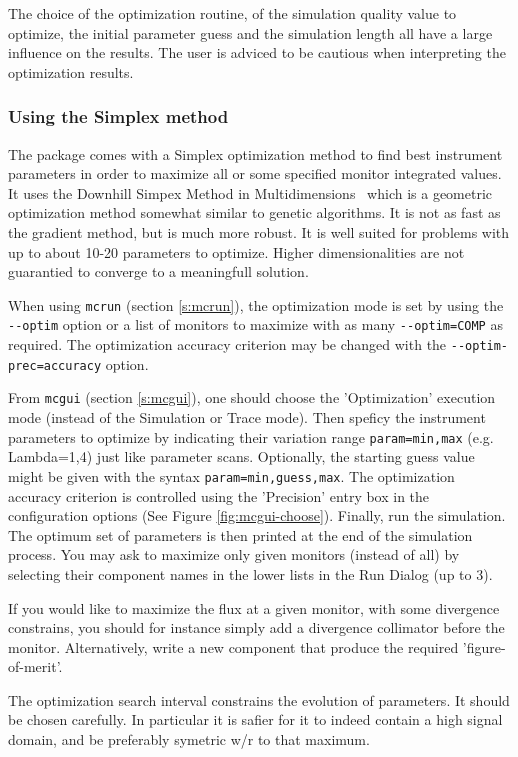 The choice of the optimization routine, of the simulation quality
value to optimize, the initial parameter guess and the simulation
length all have a large influence on the results.
The user is adviced to be cautious when interpreting the optimization results.

\subsubsection{Using the Simplex method}

The \MCS package comes with a Simplex optimization method to find best instrument parameters in order to maximize all or some specified monitor integrated values. It uses the Downhill Simpex Method in Multidimensions~\cite{neldermead,NumRecip} which is a geometric optimization method somewhat similar to genetic algorithms. It is not as fast as the gradient method, but is much more robust. It is well suited for problems with up to about 10-20 parameters to optimize. Higher dimensionalities are not guarantied to converge to a meaningfull solution.

When using \verb+mcrun+ (section \ref{s:mcrun}), the optimization mode is set by using the
\verb+--optim+ option or a list of monitors to maximize with as many
\verb+--optim=COMP+ as required. The optimization accuracy criterion
may be changed with the \verb+--optim-prec=accuracy+ option.

From \verb+mcgui+ (section \ref{s:mcgui}), one should choose the
'Optimization' execution mode (instead of the Simulation or Trace
mode). Then speficy the instrument parameters to optimize by
indicating their variation range \verb+param=min,max+ (e.g. Lambda=1,4) just like
parameter scans. Optionally, the starting guess value might be given with the syntax \verb+param=min,guess,max+. The optimization accuracy criterion is controlled
using the 'Precision' entry box in the configuration options (See
Figure \ref{fig:mcgui-choose}). Finally, run the simulation. The optimum
set of parameters is then printed at the end of the simulation
process. You may ask to maximize only given monitors (instead of all)
by selecting their component names in the lower lists in the Run Dialog (up to 3).

If you would like to maximize the flux at a given monitor, with some
divergence constrains, you should for instance simply add a divergence
collimator before the monitor. Alternatively, write a new component
that produce the required 'figure-of-merit'.

The optimization search interval constrains the evolution of parameters. It should be chosen carefully. In particular it is safier for it to indeed contain a high signal domain, and be preferably symetric w/r to that maximum.

